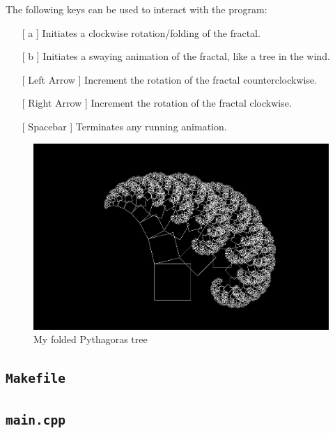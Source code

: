 \documentclass[12pt]{article}
\begin{document}
The following keys can be used to interact with the program:

\begin{itemize}

\item[[ a]] Initiates a clockwise rotation/folding of the fractal.

\item [[ b]] Initiates a swaying animation of the fractal, like a tree in the wind.

\item [[ Left Arrow]] Increment the rotation of the fractal counterclockwise.

\item [[ Right Arrow]] Increment the rotation of the fractal clockwise.

\item[[ Spacebar]] Terminates any running animation.

\end{itemize}

\begin{figure}

\includegraphics[scale=0.3]{../ps1/screenshot_folded.png}
\centering
\caption{My folded Pythagoras tree}
\label{fig:folded_pythagoras}
\end{figure}

\subsection{\texttt{Makefile}}



\subsection{\texttt{main.cpp}}
\end{document}
